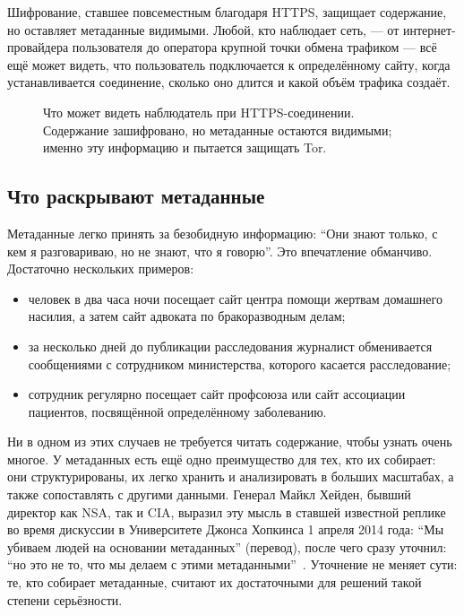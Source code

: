 Шифрование, ставшее повсеместным благодаря HTTPS, защищает содержание, но оставляет метаданные видимыми. Любой, кто наблюдает сеть, --- от интернет-провайдера пользователя до оператора крупной точки обмена трафиком --- всё ещё может видеть, что пользователь подключается к определённому сайту, когда устанавливается соединение, сколько оно длится и какой объём трафика создаёт.

\begin{figure}[htbp]
\centering

\caption{Что может видеть наблюдатель при HTTPS-соединении. Содержание зашифровано, но метаданные остаются видимыми; именно эту информацию и пытается защищать Tor.}
\label{fig:metadati}
\end{figure}

\subsection{Что раскрывают метаданные}

Метаданные легко принять за безобидную информацию: \enquote{Они знают только, с кем я разговариваю, но не знают, что я говорю}. Это впечатление обманчиво. Достаточно нескольких примеров:
\begin{itemize}
  \item человек в два часа ночи посещает сайт центра помощи жертвам домашнего насилия, а затем сайт адвоката по бракоразводным делам;
  \item за несколько дней до публикации расследования журналист обменивается сообщениями с сотрудником министерства, которого касается расследование;
  \item сотрудник регулярно посещает сайт профсоюза или сайт ассоциации пациентов, посвящённой определённому заболеванию.
\end{itemize}
Ни в одном из этих случаев не требуется читать содержание, чтобы узнать очень многое. У метаданных есть ещё одно преимущество для тех, кто их собирает: они структурированы, их легко хранить и анализировать в больших масштабах, а также сопоставлять с другими данными. Генерал Майкл Хейден, бывший директор как NSA, так и CIA, выразил эту мысль в ставшей известной реплике во время дискуссии в Университете Джонса Хопкинса 1 апреля 2014 года: \enquote{Мы убиваем людей на основании метаданных} (перевод), после чего сразу уточнил: \enquote{но это не то, что мы делаем с этими метаданными}~\cite{hayden2014metadata}. Уточнение не меняет сути: те, кто собирает метаданные, считают их достаточными для решений такой степени серьёзности.

